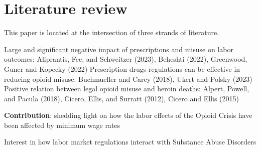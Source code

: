 \documentclass[12pt,a4paper]{article}
\begin{document}
\section*{Literature review}

This paper is located at the intersection of three strands of literature.

Large and significant negative impact of prescriptions and misuse on labor outcomes: Aliprantis, Fee, and Schweitzer (2023), Beheshti (2022), Greenwood, Guner and Kopecky (2022) %
Prescription drugs regulations can be effective in reducing opioid misuse: Buchmueller and Carey (2018), Ukert and Polsky (2023)
Positive relation between legal opioid misuse and heroin deaths: Alpert, Powell, and Pacula (2018), Cicero, Ellis, and Surratt (2012), Cicero and Ellis (2015)

\textbf{Contribution}: shedding light on how the labor effects of the Opioid Crisis have been affected by minimum wage rates

Interest in how labor market regulations interact with Substance Abuse Disorders
\end{document}
